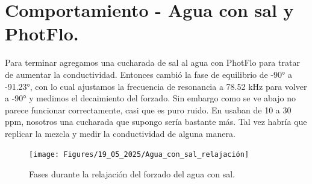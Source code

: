 \section{Comportamiento - Agua con sal y PhotFlo.}
Para terminar agregamos una cucharada de sal al agua con PhotFlo para tratar de aumentar la conductividad. Entonces cambió la fase de equilibrio de -90° a -91.23°, con lo cual ajustamos la frecuencia de resonancia a 78.52 kHz para volver a -90° y medimos el decaimiento del forzado. Sin embargo como se ve abajo no parece funcionar correctamente, casi que es puro ruido. En \cite{gordillozavaletaNonpropagatingHydrodynamicSolitons2012} usaban de 10 a 30 ppm, nosotros una cucharada que supongo sería bastante más. Tal vez habría que replicar la mezcla y medir la conductividad de alguna manera. 

\begin{figure}[th!]
	\centering
	\texttt{[image: Figures/19\_05\_2025/Agua\_con\_sal\_relajación]}
	\caption{Fases durante la relajación del forzado del agua con sal.} %
	\label{fig:aguaconsalrelajacion}
\end{figure}


 







